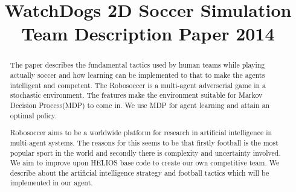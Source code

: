 \documentclass[conference,letterpaper]{IEEEtran}
\begin{document}

\title{WatchDogs 2D Soccer Simulation \\Team Description Paper 2014}


\author{
\and
{}
\and
{}
}

\maketitle

\begin{abstract}

The paper describes the fundamental tactics used by human teams while playing actually soccer and how learning can be implemented to that to make the agents intelligent and competent. The Robosoccer is a multi-agent adverserial game in a stochastic environment. The features make the environment suitable for Markov Decision Process(MDP) to come in. We use MDP for agent learning and attain an optimal policy.

Robosoccer aims to be a worldwide platform for research in artificial intelligence in multi-agent systems. The reasons for this seems to be that firstly football is the most popular sport in the world and secondly there is complexity and uncertainty involved. We aim to improve upon HELIOS base code\cite{akiyama2014helios} to create our own competitive team. We describe about the artificial intelligence strategy and football tactics which will be implemented in our agent.

\end{abstract}
\end{document}
